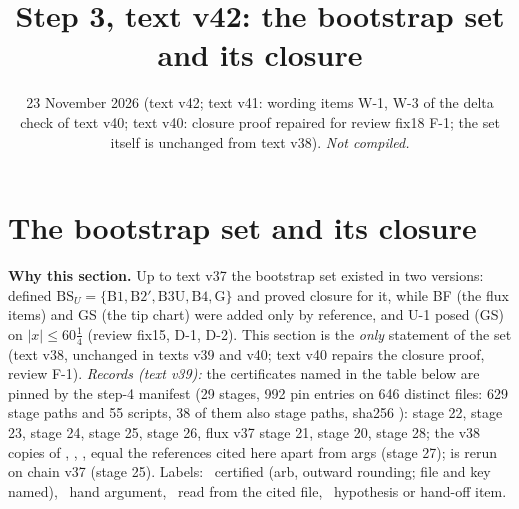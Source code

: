 \documentclass[11pt]{article}
\title{Step 3, text v42: the bootstrap set and its closure}
\author{}\date{23 November 2026 (text v42; text v41: wording items W-1, W-3 of the delta check of text v40; text v40: closure proof repaired for review fix18 F-1; the set itself is unchanged from text v38). \emph{Not compiled.}}
\begin{document}
\maketitle
\fi

\section{The bootstrap set and its closure}\label{BS:sec}
\noindent\textbf{Why this section.} Up to text v37 the bootstrap set existed in two versions:  defined $\mathrm{BS}_U=\{\mathrm{B1},\mathrm{B2}',\mathrm{B3U},\mathrm{B4},\mathrm{G}\}$ and proved closure for it, while BF (the flux items) and GS (the tip chart) were added only by reference, and U-1 posed (GS) on $|x|\le60\frac14$ (review fix15, D-1, D-2). This section is the \emph{only} statement of the set (text v38, unchanged in texts v39 and v40; text v40 repairs the closure proof, review  F-1). \emph{Records (text v39):} the certificates named in the table below are pinned by the step-4 manifest  (29 stages, 992 pin entries on 646 distinct files: 629 stage paths and 55 scripts, 38 of them also stage paths, sha256 ):  stage 22,  stage 23,  stage 24,  stage 25,  stage 26, flux v37 stage 21,  stage 20,  stage 28; the v38 copies of , , ,  equal the references cited here apart from args (stage 27);  is rerun on chain v37 (stage 25). Labels: \tC\ certified (arb, outward rounding; file and key named), \tHd\ hand argument, \tR\ read from the cited file, \tH\ hypothesis or hand-off item.
\end{document}
